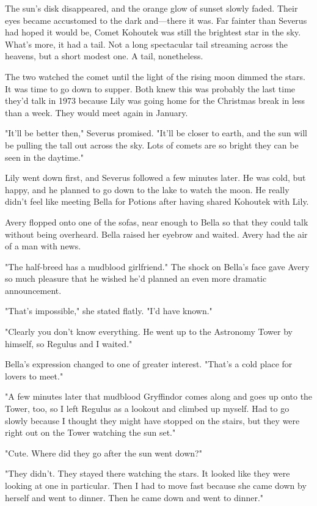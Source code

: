 The sun's disk disappeared, and the orange glow of sunset slowly faded. Their eyes became accustomed to the dark and—there it was. Far fainter than Severus had hoped it would be, Comet Kohoutek was still the brightest star in the sky. What's more, it had a tail. Not a long spectacular tail streaming across the heavens, but a short modest one. A tail, nonetheless.

The two watched the comet until the light of the rising moon dimmed the stars. It was time to go down to supper. Both knew this was probably the last time they'd talk in 1973 because Lily was going home for the Christmas break in less than a week. They would meet again in January.

"It'll be better then," Severus promised. "It'll be closer to earth, and the sun will be pulling the tall out across the sky. Lots of comets are so bright they can be seen in the daytime."

Lily went down first, and Severus followed a few minutes later. He was cold, but happy, and he planned to go down to the lake to watch the moon. He really didn't feel like meeting Bella for Potions after having shared Kohoutek with Lily.

Avery flopped onto one of the sofas, near enough to Bella so that they could talk without being overheard. Bella raised her eyebrow and waited. Avery had the air of a man with news.

"The half-breed has a mudblood girlfriend." The shock on Bella's face gave Avery so much pleasure that he wished he'd planned an even more dramatic announcement.

"That's impossible," she stated flatly. "I'd have known."

"Clearly you don't know everything. He went up to the Astronomy Tower by himself, so Regulus and I waited."

Bella's expression changed to one of greater interest. "That's a cold place for lovers to meet."

"A few minutes later that mudblood Gryffindor comes along and goes up onto the Tower, too, so I left Regulus as a lookout and climbed up myself. Had to go slowly because I thought they might have stopped on the stairs, but they were right out on the Tower watching the sun set."

"Cute. Where did they go after the sun went down?"

"They didn't. They stayed there watching the stars. It looked like they were looking at one in particular. Then I had to move fast because she came down by herself and went to dinner. Then he came down and went to dinner."

